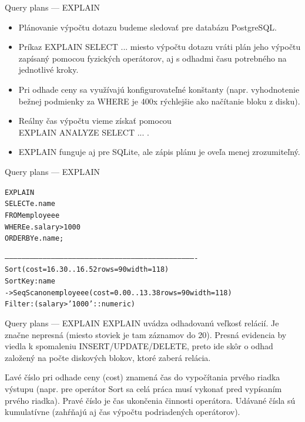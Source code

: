 \documentclass[12pt]{beamer}
\begin{document}
\begin{frame}[fragile]{Query plans --- EXPLAIN}
\begin{itemize}
  \item Plánovanie výpočtu dotazu budeme sledovať pre databázu PostgreSQL.
  \item Príkaz EXPLAIN SELECT ... miesto výpočtu dotazu vráti
      plán jeho výpočtu zapísaný pomocou fyzických operátorov,
      aj s odhadmi času potrebného na jednotlivé kroky.
  \item Pri odhade ceny sa využívajú konfigurovateľné konštanty
  (napr. vyhodnotenie bežnej podmienky za WHERE je 400x rýchlejšie ako načítanie bloku z disku).
  \item Reálny čas výpočtu vieme získať pomocou\\ EXPLAIN ANALYZE SELECT ... .
  \item EXPLAIN funguje aj pre SQLite, ale zápis plánu je oveľa menej zrozumiteľný.
\end{itemize}
\end{frame}

\begin{frame}[fragile]{Query plans --- EXPLAIN}
\begin{alltt}
\alert{EXPLAIN}
SELECT e.name
FROM employee e
WHERE e.salary > 1000
ORDER BY e.name;
\end{alltt}
\scriptsize
\begin{alltt}
----------------------------------------------------------------------------------------------------------------------------------------
 Sort  (cost=16.30..16.52 rows=90 width=118)
   Sort Key: name
   ->  Seq Scan on employee e  (cost=0.00..13.38 rows=90 width=118)
         Filter: (salary > '1000'::numeric)
\end{alltt}
\end{frame}

\begin{frame}[fragile]{Query plans --- EXPLAIN}
EXPLAIN uvádza odhadovanú veľkosť relácií. Je značne nepresná (miesto stoviek je tam záznamov do 20).
Presná evidencia by viedla k spomaleniu INSERT/UPDATE/DELETE,
preto ide skôr o odhad založený na počte diskových blokov, ktoré zaberá relácia.
\bigskip

Ľavé číslo pri odhade ceny (cost) znamená čas do vypočítania prvého riadka výstupu
(napr. pre operátor Sort sa celá práca musí vykonať pred vypísaním prvého riadka).
Pravé číslo je čas ukončenia činnosti operátora.
Udávané čísla sú kumulatívne (zahŕňajú aj čas výpočtu podriadených operátorov).
\end{frame}
\end{document}
